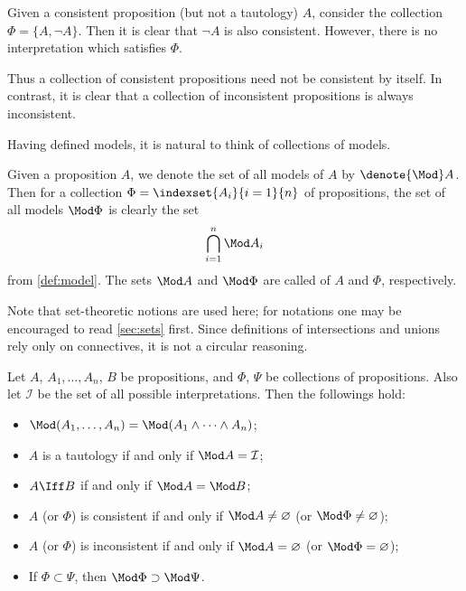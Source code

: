 \begin{example}
    \label{exm:satisfy}
    Given a consistent proposition (but not a tautology) \(A\),
    consider the collection \(\Phi=\{A,\neg A\}\).
    Then it is clear that \(\neg A\) is also consistent.
    However, there is no interpretation which satisfies \(\Phi\).
\end{example}

Thus a collection of consistent propositions
need not be consistent by itself.
In contrast, it is clear that
a collection of inconsistent propositions
is always inconsistent.

Having defined models,
it is natural to think of collections of models.

\begin{definition}
    \label{def:modelset}
    Given a proposition \(A\),
    we denote the set of all models of \(A\) by \(\denote{\Mod} A\).
    Then for a collection \(\Phi=\indexset{A_i}{i=1}{n}\)
    of propositions,
    the set of all models \(\Mod\Phi\) is clearly the set
    \[
        \bigcap_{i=1}^n\Mod A_i
    \]
    from \cref{def:model}.
    The sets \(\Mod A\) and \(\Mod\Phi\) are called
     of \(A\) and \(\Phi\), respectively.
\end{definition}

Note that set-theoretic notions are used here;
for notations one may be encouraged to read \cref{sec:sets} first.
Since definitions of intersections and unions rely only on connectives,
it is not a circular reasoning.

\begin{remark}
    Let \(A\), \(A_1,\dots,A_n\), \(B\) be propositions,
    and \(\Phi\), \(\Psi\) be collections of propositions.
    Also let \(\mathcal I\) be the set of all possible interpretations.
    Then the followings hold:
    \begin{itemize}
        \item \(\Mod(A_1,\dots,A_n)=\Mod(A_1\wedge\dots\wedge A_n)\);
        \item \(A\) is a tautology if and only if \(\Mod A=\mathcal I\);
        \item \(A\Iff B\) if and only if \(\Mod A=\Mod B\);
        \item \(A\) (or \(\Phi\)) is consistent
        if and only if \(\Mod A\neq\varnothing\)
        (or \(\Mod\Phi\neq\varnothing\));
        \item \(A\) (or \(\Phi\)) is inconsistent
        if and only if \(\Mod A=\varnothing\)
        (or \(\Mod\Phi=\varnothing\));
        \item If \(\Phi\subset\Psi\), then \(\Mod\Phi\supset\Mod\Psi\).
    \end{itemize}
\end{remark}

